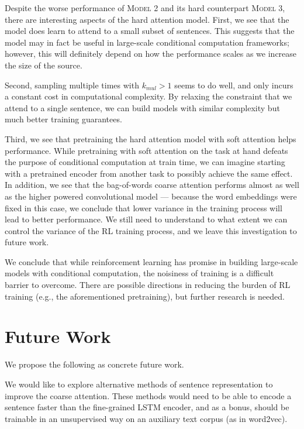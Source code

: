 \documentclass[12pt]{report}
\begin{document}
Despite the worse performance of \textsc{Model 2} and its hard counterpart \textsc{Model 3}, there are interesting aspects of the hard attention model. First, we see that the model does learn to attend to a small subset of sentences. This suggests that the model may in fact be useful in large-scale conditional computation frameworks; however, this will definitely depend on how the performance scales as we increase the size of the source.

Second, sampling multiple times with $k_{mul} > 1$ seems to do well, and only incurs a constant cost in computational complexity. By relaxing the constraint that we attend to a single sentence, we can build models with similar complexity but much better training guarantees. 


Third, we see that pretraining the hard attention model with soft attention helps performance. While pretraining with soft attention on the task at hand defeats the purpose of conditional computation at train time, we can imagine starting with a pretrained encoder from another task to possibly achieve the same effect.
In addition, we see that the bag-of-words coarse attention performs almost as well as the higher powered convolutional model --- because the word embeddings were fixed in this case, we conclude that lower variance in the training process will lead to better performance. We still need to understand to what extent we can control the variance of the RL training process, and we leave this investigation to future work.

We conclude that while reinforcement learning has promise in building large-scale models with conditional computation, the noisiness of training is a difficult barrier to overcome. There are possible directions in reducing the burden of RL training (e.g., the aforementioned pretraining), but further research is needed.


\section{Future Work}

We propose the following as concrete future work.

We would like to explore alternative methods of sentence representation to improve the coarse attention. These methods would need to be able to encode a sentence faster than the fine-grained LSTM encoder, and as a bonus, should be trainable in an unsupervised way on an auxiliary text corpus (as in word2vec).
\end{document}
